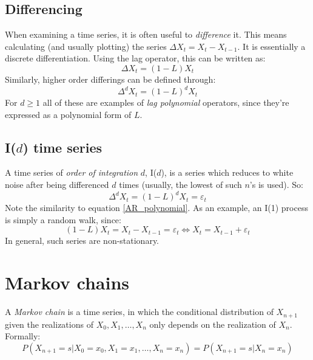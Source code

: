 \documentclass[12pt, a4paper]{article}
\numberwithin{equation}{section}
\begin{document}
\subsection{Differencing}
When examining a time series, it is often useful to \textit{difference} it. This means calculating (and usually plotting) the series $\Delta X_t=X_t-X_{t-1}$. It is essentially a discrete differentiation. Using the lag operator, this can be written as:
\begin{equation}
\Delta X_t=(1-L)X_t
\end{equation}
Similarly, higher order differings can be defined through:
\begin{equation}
\Delta^d X_t=(1-L)^d X_t
\end{equation}
For $d\ge 1$ all of these are examples of \textit{lag polynomial} operators, since they're expressed as a polynomial form of $L$.

\subsection{I($d$) time series}
A time series of \textit{order of integration} $d$, I($d$), is a series which reduces to white noise after being differenced $d$ times (usually, the lowest of such $n$'s is used). So:
\begin{equation}
\Delta^d X_t=(1-L)^d X_t=\varepsilon_t
\end{equation}
Note the similarity to equation \ref{AR_polynomial}. As an example, an I(1) process is simply a random walk, since:
\begin{equation}
(1-L)X_t=X_t-X_{t-1}=\varepsilon_t\Leftrightarrow X_t=X_{t-1}+\varepsilon_t
\end{equation}
In general, such series are non-stationary.

\section{Markov chains}
A \textit{Markov chain} is a time series, in which the conditional distribution of $X_{n+1}$ given the realizations of $X_0, X_1,\ldots, X_n$ only depends on the realization of $X_n$. Formally:
\begin{equation}
P(X_{n+1}=s|X_0=x_0, X_1=x_1,\ldots, X_n=x_n)=P(X_{n+1}=s|X_n=x_n)
\end{equation}
\end{document}
